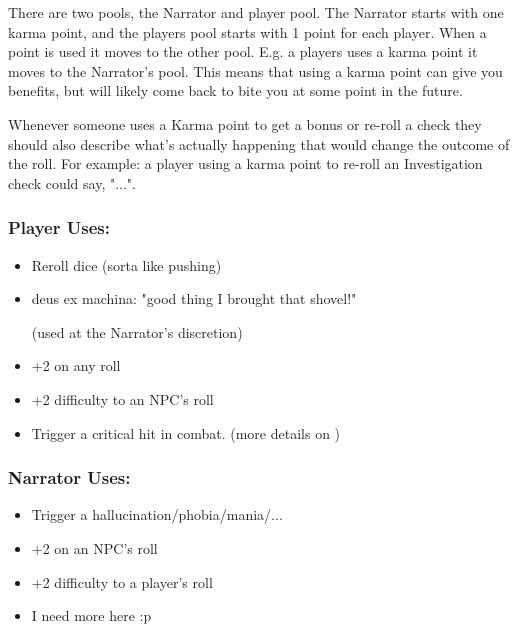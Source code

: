 There are two pools, the Narrator and player pool. 
The Narrator starts with one karma point, and the players pool starts with 1 point for each player.
When a point is used it moves to the other pool. E.g. a players uses a karma point it moves to the Narrator's pool.
This means that using a karma point can give you benefits, but will likely come back to bite you at some point in the future.
  
Whenever someone uses a Karma point to get a bonus or re-roll a check 
they should also describe what's actually happening that would change the outcome of the roll.
For example: a player using a karma point to re-roll an Investigation check could say, 
"...".

\subsubsection{Player Uses:}
\begin{itemize}[topsep=0pt]
    \item Reroll dice (sorta like pushing)
    \item deus ex machina: "good thing I brought that shovel!" \par(used at the Narrator's discretion)
    \item +2 on any roll
    \item +2 difficulty to an NPC's roll
    \item Trigger a critical hit in combat. (more details on )
\end{itemize}

\subsubsection{Narrator Uses:}
\begin{itemize}[topsep=0pt]
    \item Trigger a hallucination/phobia/mania/...
    \item +2 on an NPC's roll
    \item +2 difficulty to a player's roll
    \item I need more here :p
\end{itemize}

